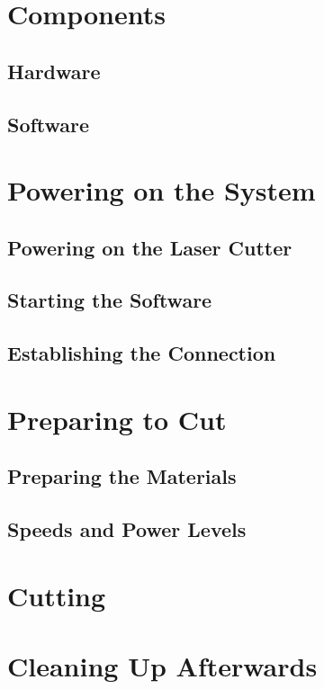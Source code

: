 \documentclass[letterpaper]{latexclasses/tmarticle}
\begin{document}
\maketitle

\newpage
\tableofcontents

\newpage

\section{Components}

\subsection{Hardware}

\subsection{Software}

\section{Powering on the System}

\subsection{Powering on the Laser Cutter}

\subsection{Starting the Software}

\subsection{Establishing the Connection}

\section{Preparing to Cut}

\subsection{Preparing the Materials}

\subsection{Speeds and Power Levels}

\section{Cutting}

\section{Cleaning Up Afterwards}
\end{document}
